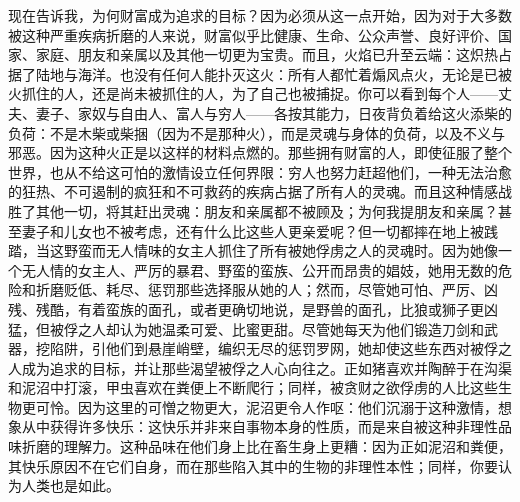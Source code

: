 现在告诉我，为何财富成为追求的目标？因为必须从这一点开始，因为对于大多数被这种严重疾病折磨的人来说，财富似乎比健康、生命、公众声誉、良好评价、国家、家庭、朋友和亲属以及其他一切更为宝贵。而且，火焰已升至云端：这炽热占据了陆地与海洋。也没有任何人能扑灭这火：所有人都忙着煽风点火，无论是已被火抓住的人，还是尚未被抓住的人，为了自己也被捕捉。你可以看到每个人——丈夫、妻子、家奴与自由人、富人与穷人——各按其能力，日夜背负着给这火添柴的负荷：不是木柴或柴捆（因为不是那种火），而是灵魂与身体的负荷，以及不义与邪恶。因为这种火正是以这样的材料点燃的。那些拥有财富的人，即使征服了整个世界，也从不给这可怕的激情设立任何界限：穷人也努力赶超他们，一种无法治愈的狂热、不可遏制的疯狂和不可救药的疾病占据了所有人的灵魂。而且这种情感战胜了其他一切，将其赶出灵魂：朋友和亲属都不被顾及；为何我提朋友和亲属？甚至妻子和儿女也不被考虑，还有什么比这些人更亲爱呢？但一切都摔在地上被践踏，当这野蛮而无人情味的女主人抓住了所有被她俘虏之人的灵魂时。因为她像一个无人情的女主人、严厉的暴君、野蛮的蛮族、公开而昂贵的娼妓，她用无数的危险和折磨贬低、耗尽、惩罚那些选择服从她的人；然而，尽管她可怕、严厉、凶残、残酷，有着蛮族的面孔，或者更确切地说，是野兽的面孔，比狼或狮子更凶猛，但被俘之人却认为她温柔可爱、比蜜更甜。尽管她每天为他们锻造刀剑和武器，挖陷阱，引他们到悬崖峭壁，编织无尽的惩罚罗网，她却使这些东西对被俘之人成为追求的目标，并让那些渴望被俘之人心向往之。正如猪喜欢并陶醉于在沟渠和泥沼中打滚，甲虫喜欢在粪便上不断爬行；同样，被贪财之欲俘虏的人比这些生物更可怜。因为这里的可憎之物更大，泥沼更令人作呕：他们沉溺于这种激情，想象从中获得许多快乐：这快乐并非来自事物本身的性质，而是来自被这种非理性品味折磨的理解力。这种品味在他们身上比在畜生身上更糟：因为正如泥沼和粪便，其快乐原因不在它们自身，而在那些陷入其中的生物的非理性本性；同样，你要认为人类也是如此。\par

